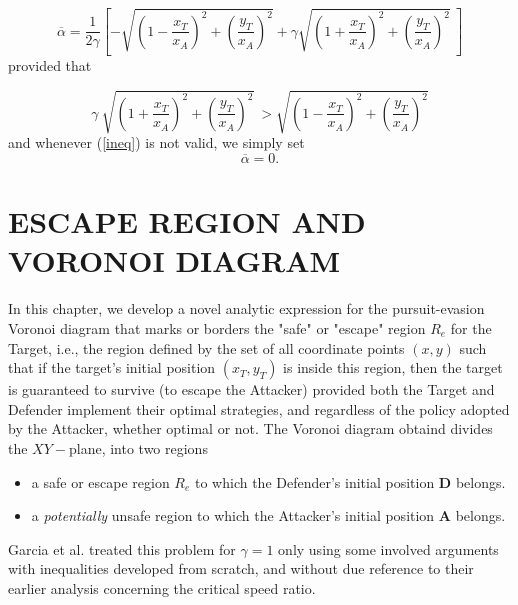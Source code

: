 \documentclass[final,5p,times,twocolumn]{elsarticle}
\begin{document}
\begin{equation}
\overline{\alpha} = \dfrac{1}{2 \gamma} [-\sqrt{(1-\dfrac{x_T}{x_A})^2 + (\dfrac{y_T}{x_A})^2}+ \gamma \sqrt{(1+\dfrac{x_T}{x_A})^2 + (\dfrac{y_T}{x_A})^2}\ ]
\label{dimensionless-alphaCR}
\end{equation} 
provided that 

\begin{equation}
\gamma\ \sqrt{(1+\dfrac{x_T}{x_A})^2 + (\dfrac{y_T}{x_A})^2}\ > \sqrt{(1-\dfrac{x_T}{x_A})^2 + (\dfrac{y_T}{x_A})^2}
\label{ineq}
\end{equation}
and whenever (\ref{ineq}) is not valid, we simply set
\begin{equation}
\overline{\alpha}=0.
\end{equation}

\section{ESCAPE REGION AND VORONOI DIAGRAM}
In this chapter, we develop a novel analytic expression for the pursuit-evasion Voronoi diagram \cite{pachter2014active} that marks or borders the "safe" or "escape" region $R_{e}$ for the Target, i.e., the region defined by the set of all coordinate points $(x,y)$ such that if the target's initial position $(x_{T},y_{T})$ is inside this region, then the target is guaranteed to survive (to escape the Attacker) provided both the Target and Defender implement their optimal strategies, and regardless of the policy adopted by the Attacker, whether optimal or not.
The Voronoi diagram obtaind divides the $XY-$plane, into two regions 
\begin{itemize}
\item a safe or escape region $R_{e}$ to which the Defender's initial position $\boldsymbol{D}$ belongs.
\item a \textit{potentially} unsafe region to which the Attacker's initial position $\boldsymbol{A}$ belongs.
\end{itemize}
Garcia et al. \cite{pachter2014active} treated this problem for $\gamma=1$ only using some involved arguments with inequalities developed from scratch, and without due reference to their earlier analysis concerning the critical speed ratio.\\
\end{document}
